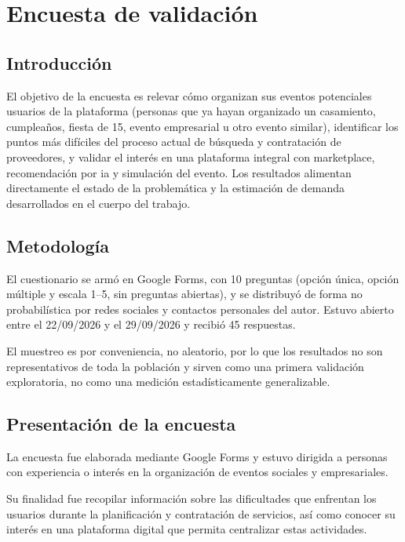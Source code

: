 
\chapter{Encuesta de validación}\label{apx:encuesta}

\section{Introducción}

El objetivo de la encuesta es relevar cómo organizan sus eventos
potenciales usuarios de la plataforma (personas que ya hayan organizado
un casamiento, cumpleaños, fiesta de 15, evento empresarial u otro
evento similar), identificar los puntos más difíciles del proceso actual
de búsqueda y contratación de proveedores, y validar el interés en una
plataforma integral con marketplace, recomendación por \gls{ia} y
simulación del evento. Los resultados alimentan directamente el
estado de la problemática y la estimación de demanda desarrollados en
el cuerpo del trabajo.

\section{Metodología}

El cuestionario se armó en Google Forms, con 10 preguntas (opción única,
opción múltiple y escala 1--5, sin preguntas abiertas), y se distribuyó
de forma no probabilística por redes sociales y contactos personales del
autor. Estuvo abierto entre el 22/09/2026 y el 29/09/2026 y recibió 45
respuestas.

El muestreo es por conveniencia, no aleatorio, por lo que los resultados
no son representativos de toda la población y sirven como una primera
validación exploratoria, no como una medición estadísticamente
generalizable.

\section{Presentación de la encuesta}

La encuesta fue elaborada mediante Google Forms y estuvo dirigida a
personas con experiencia o interés en la organización de eventos
sociales y empresariales.

Su finalidad fue recopilar información sobre las dificultades que
enfrentan los usuarios durante la planificación y contratación de
servicios, así como conocer su interés en una plataforma digital que
permita centralizar estas actividades.


